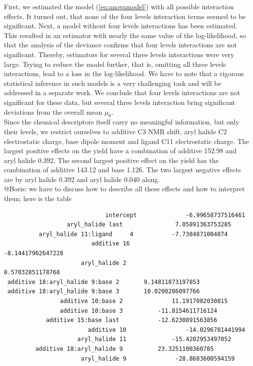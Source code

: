 \documentclass[12pt]{article}
\begin{document}
First, we estimated the model (\ref{eq:anovamodel}) with all possible interaction effects. It turned out, that none of the four levels interaction terms seemed to be significant. Next, a model without four levels interactions has been estimated. This resulted in an estimator with nearly the same value of the log-likelihood, so that the analysis of the deviance confirms that four levels interactions are not significant. Thereby, estimators for several three levels interactions were very large. Trying to reduce the model further, that is, omitting all three levels interactions, lead to a loss in the log-likelihood. We have to note that a rigorous statistical inference in such models is a very challenging task and will be addressed in a separate work. We conclude that four levels interactions are not significant for these data, but several three levels interaction bring significant deviations from the overall mean $\mu_0$. \\
Since the chemical descriptors itself carry no meaningful information, but only their levels, we restrict ourselves to {\color{blue} additive C3 NMR shift, aryl halide C2 electrostatic charge, base dipole moment and ligand C11 electrostatic charge}. The largest positive effects on the yield have a combination of {\color{blue} additive 152.98} and {\color{blue} aryl halide 0.392}. The second largest positive effect on the yield has the combination of {\color{blue} additive 143.12} and {\color{blue} base 1.126}. The two largest negative effects are by {\color{blue} aryl halide 0.392} and {\color{blue} aryl halide 0.040} along. \\
{\color{red} @Boris: we have to discuss how to describe all these effects and how to interpret them; here is the table}
\begin{verbatim}
	                         intercept 				-6.99658737516461
                  aryl_halide last 				 7.05891363753285
          aryl_halide 11:ligand 	4  			-7.7384871004874
                         additive 16 					-8.14417962647228
                      aryl_halide 2 					 8.57032851178768
 additive 18:aryl_halide 9:base 2  		9.14811873197853
 additive 18:aryl_halide 9:base 3  		10.0200286097766
                additive 10:base 2  			11.1917082030815
                additive 10:base 3 			-11.8154611716124
            additive 15:base last 			-12.6230891563856
                        additive 10 				-14.0296781441994
                     aryl_halide 11 			-15.4202953497052
         additive 18:aryl_halide 9  	   	23.3251100360785
                      aryl_halide 9				 -28.8683600594159
\end{verbatim}
\end{document}
